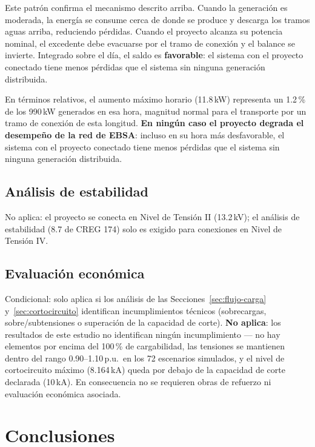 \documentclass[11pt,a4paper]{article}
\begin{document}
Este patr\'on confirma el mecanismo descrito arriba. Cuando la generaci\'on es moderada, la energ\'ia se consume cerca de donde se produce y descarga los tramos aguas arriba, reduciendo p\'erdidas. Cuando el proyecto alcanza su potencia nominal, el excedente debe evacuarse por el tramo de conexi\'on y el balance se invierte. Integrado sobre el d\'ia, el saldo es \textbf{favorable}: el sistema con el proyecto conectado tiene menos p\'erdidas que el sistema sin ninguna generaci\'on distribuida.

En t\'erminos relativos, el aumento m\'aximo horario (11.8\,kW) representa un
1.2\,\% de los 990\,kW generados en esa hora, magnitud normal para el transporte por un
tramo de conexi\'on de esta longitud. \textbf{En ning\'un caso el proyecto degrada
el desempe\~no de la red de EBSA}: incluso en su hora m\'as desfavorable, el
sistema con el proyecto conectado tiene menos p\'erdidas que el sistema sin
ninguna generaci\'on distribuida.

\subsection{An\'alisis de estabilidad}
No aplica: el proyecto se conecta en Nivel de Tensi\'on II (13.2\,kV); el an\'alisis de estabilidad (8.7 de CREG 174) solo es exigido para conexiones en Nivel de Tensi\'on IV.

\subsection{Evaluaci\'on econ\'omica}
Condicional: solo aplica si los an\'alisis de las Secciones~\ref{sec:flujo-carga} y~\ref{sec:cortocircuito} identifican incumplimientos t\'ecnicos (sobrecargas, sobre/subtensiones o superaci\'on de la capacidad de corte). \textbf{No aplica}: los resultados de este estudio no identifican ning\'un incumplimiento --- no hay elementos por encima del 100\,\% de cargabilidad, las tensiones se mantienen dentro del rango 0.90--1.10\,p.u.\ en los 72 escenarios simulados, y el nivel de cortocircuito m\'aximo (8.164\,kA) queda por debajo de la capacidad de corte declarada (10\,kA). En consecuencia no se requieren obras de refuerzo ni evaluaci\'on econ\'omica asociada.

\section{Conclusiones}
\label{sec:conclusiones}
\end{document}
